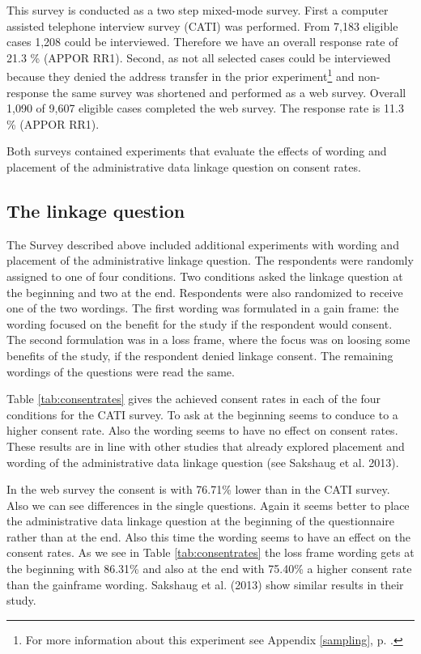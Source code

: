 This survey is conducted as a two step mixed-mode survey. First a computer assisted telephone interview survey (CATI) was performed. From 7,183 eligible cases 1,208 could be interviewed. Therefore we have an overall response rate of 21.3 \% (APPOR RR1). Second, as not all selected cases could be interviewed because they denied the address transfer in the prior experiment\footnote{For more information about this experiment see Appendix \ref{sampling}, p. \pageref{sampling}.} and non-response the same survey was shortened and performed as a web survey. Overall 1,090 of 9,607 eligible cases completed the web survey. The response rate is 11.3 \% (APPOR RR1).

Both surveys contained experiments that evaluate the effects of wording and placement of the administrative data linkage question on consent rates. 

\subsection*{The linkage question}

The Survey described above included additional experiments with wording and placement of the administrative
linkage question.  The respondents were randomly assigned to one of four conditions. Two conditions asked the linkage question at the beginning and two at the end. Respondents were also randomized to receive one of the two wordings. The first wording was formulated in a gain frame: the wording focused on the benefit for the study if the respondent would consent. The second formulation was in a loss frame, where the focus was on loosing some benefits of the study, if the respondent denied linkage consent. The remaining wordings of the questions were read the same. 

Table \ref{tab:consentrates} gives the achieved consent rates in each of the four conditions for the CATI survey. To ask at the beginning seems to conduce to a higher consent rate. Also the wording seems to have no effect on consent rates. These results are in line with other studies that already explored placement and wording of the administrative data linkage question (see Sakshaug et al. 2013).

In the web survey the consent is with 76.71\% lower than in the CATI survey. Also we can
see differences in the single questions. Again it seems better to place the
administrative data linkage question at the beginning of the questionnaire rather than at
the end. Also this time the wording seems to have an effect on the consent rates. As we see in Table \ref{tab:consentrates} the loss frame wording gets at the beginning with 86.31\% and also at the end with 75.40\% a higher consent rate than the gainframe wording. Sakshaug et al. (2013) show similar results in their study.


